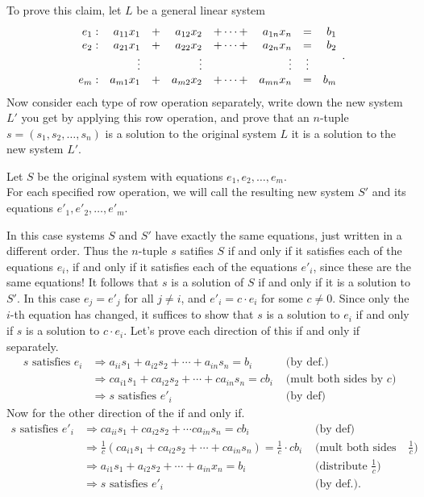 To prove this claim, let $L$ be a general linear system
\[
 \begin{array}{rrcrcrcr} e_1:& a_{11}x_{1}&+&a_{12}x_{2}&+\cdots+& a_{1n}x_{n}&=&b_1\\ e_2: &a_{21}x_{1}&+&a_{22}x_{2}&+\cdots+&a_{2n}x_{n}&=&b_2\\ &\vdots& &\vdots & &\vdots & \vdots\\ e_m: &a_{m1}x_{1}&+&a_{m2}x_{2}&+\cdots +&a_{mn}x_{n}&=&b_m \end{array}.
\]
Now consider each type of row operation separately, write down the new system $L'$ you get by applying this row operation, and prove that an $n$-tuple $s=(s_1,s_2,\dots ,s_n)$ is a solution to the original system $L$  it is a solution to the new system $L'$. 
\\
\begin{solution} \noindent
Let $S$ be the original system with equations $e_1,e_2,\dots ,e_m$. \\
For each specified row operation, we will call the resulting new system $S'$ and its equations $e'_1,e'_2,\dots , e'_m$.  

\begin{description}
 In this case systems $S$ and $S'$ have exactly the same equations, just written in a different order. Thus the $n$-tuple $s$ satifies $S$ if and only if it satisfies each of the equations $e_i$, if and only if it satisfies each of the equations $e'_i$, since these are the same equations! It follows that $s$ is a solution of $S$ if and only if it is a solution to $S'$.
 In this case $e_j=e'_j$ for all $j\ne i$, and $e'_i=c\cdot e_i$ for some $c\ne 0$. Since only the $i$-th equation has changed, it suffices to show that $s$ is a solution to $e_i$ if and only if $s$ is a solution to $c\cdot e_i$. Let's prove each direction of this if and only if separately. 
\begin{align*}
s \text{ satisfies } e_i&\Rightarrow  a_{ii}s_1+a_{i2}s_2+\cdots +a_{in}s_n=b_i & \text{ (by def.)}\\
&\Rightarrow  ca_{i1}s_1+ca_{i2}s_2+\cdots +ca_{in}s_n=cb_i & \text{ (mult both sides by $c$)}\\
&\Rightarrow  s \text{ satisfies } e'_i &\text{ (by def)}
\end{align*}
Now for the other direction of the if and only if. 
\begin{align*}
s \text{ satisfies } e'_i &\Rightarrow ca_{ii}s_1+ca_{i2}s_2+\cdots ca_{in}s_n=cb_i &\text{ (by def)}\\
&\Rightarrow \frac{1}{c}(ca_{i1}s_1+ca_{i2}s_2+\cdots +ca_{in}s_n)=\frac{1}{c}\cdot cb_i & \text{ (mult both sides by $\frac{1}{c}$)}\\
&\Rightarrow a_{i1}s_1+a_{i2}s_2+\cdots +a_{in}x_n=b_i & \text{ (distribute $\frac{1}{c}$)}\\
&\Rightarrow s \text{ satisfies } e'_i & \text{ (by def.).}
\end{align*}

\end{description}
\end{solution}
